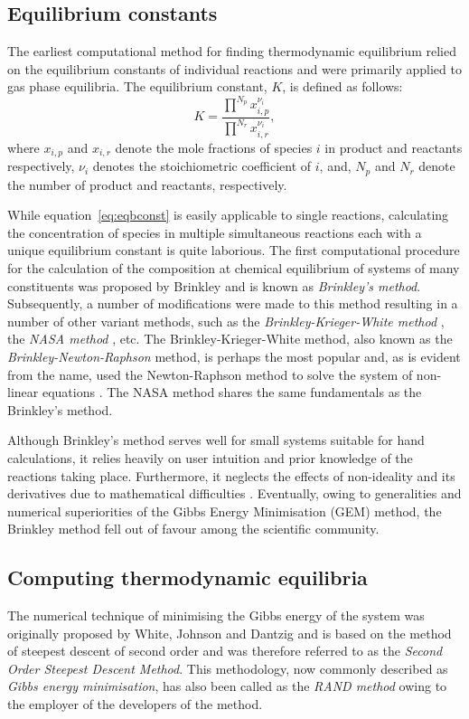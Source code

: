 	\subsection{Equilibrium constants}
	The earliest computational method for finding thermodynamic equilibrium relied on the equilibrium constants of individual reactions and were primarily applied to gas phase equilibria. The equilibrium constant, $K$, is defined as follows:
	\begin{equation}\label{eq:eqbconst}
		K = \frac{\prod^{N_p} x_{i,p}^{\nu_i}}{\prod^{N_r} x_{i,r}^{\nu_i}},
	\end{equation}
	where $x_{i,p}$ and $x_{i,r}$ denote the mole fractions of species $i$ in product and reactants respectively, $\nu_i$ denotes the stoichiometric coefficient of $i$, and, $N_p$ and $N_r$ denote the number of product and reactants, respectively.

	While equation~\eqref{eq:eqbconst} is easily applicable to single reactions, calculating the concentration of species in multiple simultaneous reactions each with a unique equilibrium constant is quite laborious. The first computational procedure for the calculation of the composition at chemical equilibrium of systems of many constituents was proposed by Brinkley \cite{Brinkley:1947aa} and is known as \emph{Brinkley's method}. Subsequently, a number of modifications were made to this method resulting in a number of other variant methods, such as the \emph{Brinkley-Krieger-White method} \cite{Krieger:1948aa}, the \emph{NASA method} \cite{Zeleznik:1968aa}, etc. The Brinkley-Krieger-White method, also known as the \emph{Brinkley-Newton-Raphson} method, is perhaps the most popular and, as is evident from the name, used the Newton-Raphson method to solve the system of non-linear equations \cite{vanZeggeren11}. The NASA method \cite{Zeleznik:1968aa} shares the same fundamentals as the Brinkley's method.

	Although Brinkley's method serves well for small systems suitable for hand calculations, it relies heavily on user intuition and prior knowledge of the reactions taking place. Furthermore, it neglects the effects of non-ideality and its derivatives due to mathematical difficulties \cite{Zeleznik:1968aa}. Eventually, owing to generalities and numerical superiorities of the Gibbs Energy Minimisation (GEM) method, the Brinkley method fell out of favour among the scientific community.

	\subsection{Computing thermodynamic equilibria}
	The numerical technique of minimising the Gibbs energy of the system was originally proposed by White, Johnson and Dantzig \cite{White:58} and is based on the method of steepest descent of second order and was therefore referred to as the \emph{Second Order Steepest Descent Method}. This methodology, now commonly described as \emph{Gibbs energy minimisation}, has also been called as the \emph{RAND method} owing to the employer of the developers of the method.

